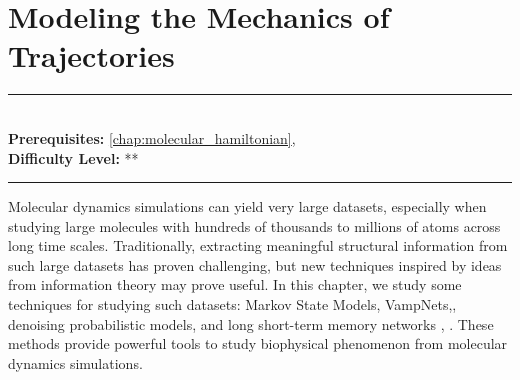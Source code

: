 \documentclass[book.tex]{subfiles}
\begin{document}
\chapter{Modeling the Mechanics of Trajectories}
\label{chap:trajectory_modeling}
\noindent\rule{11cm}{0.4pt} \\
\textbf{Prerequisites:}  \autoref{chap:molecular_hamiltonian},   \\
\textbf{Difficulty Level:} ** \\
\noindent\rule{11cm}{0.4pt}
\vspace{5mm}


Molecular dynamics simulations can yield very large datasets, especially when studying large molecules with hundreds of thousands to millions of atoms across long time scales. Traditionally, extracting meaningful structural information from such large datasets has proven challenging, but new techniques inspired by ideas from information theory may prove useful. In this chapter, we study some techniques for studying such datasets: Markov State Models, VampNets,, denoising probabilistic models, and long short-term memory networks \cite{wang2021denoising}, \cite{tsai2020learning}. These methods provide powerful tools to study biophysical phenomenon from molecular dynamics simulations.
\end{document}
